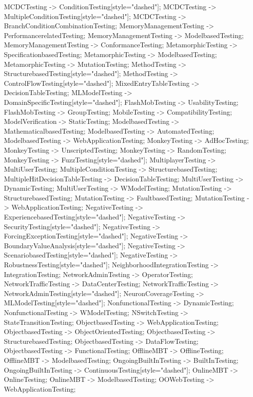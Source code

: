 \documentclass{article}
\begin{document}
{MCDCTesting -> ConditionTesting[style="dashed"];
MCDCTesting -> MultipleConditionTesting[style="dashed"];
MCDCTesting -> BranchConditionCombinationTesting;
MemoryManagementTesting -> PerformancerelatedTesting;
MemoryManagementTesting -> ModelbasedTesting;
MemoryManagementTesting -> ConformanceTesting;
MetamorphicTesting -> SpecificationbasedTesting;
MetamorphicTesting -> ModelbasedTesting;
MetamorphicTesting -> MutationTesting;
MethodTesting -> StructurebasedTesting[style="dashed"];
MethodTesting -> ControlFlowTesting[style="dashed"];
MixedEntryTableTesting -> DecisionTableTesting;
MLModelTesting -> DomainSpecificTesting[style="dashed"];
FlashMobTesting -> UsabilityTesting;
FlashMobTesting -> GroupTesting;
MobileTesting -> CompatibilityTesting;
ModelVerification -> StaticTesting;
ModelbasedTesting -> MathematicalbasedTesting;
ModelbasedTesting -> AutomatedTesting;
ModelbasedTesting -> WebApplicationTesting;
MonkeyTesting -> AdHocTesting;
MonkeyTesting -> UnscriptedTesting;
MonkeyTesting -> RandomTesting;
MonkeyTesting -> FuzzTesting[style="dashed"];
MultiplayerTesting -> MultiUserTesting;
MultipleConditionTesting -> StructurebasedTesting;
MultipleHitDecisionTableTesting -> DecisionTableTesting;
MultiUserTesting -> DynamicTesting;
MultiUserTesting -> WModelTesting;
MutationTesting -> StructurebasedTesting;
MutationTesting -> FaultbasedTesting;
MutationTesting -> WebApplicationTesting;
NegativeTesting -> ExperiencebasedTesting[style="dashed"];
NegativeTesting -> SecurityTesting[style="dashed"];
NegativeTesting -> ForcingExceptionTesting[style="dashed"];
NegativeTesting -> BoundaryValueAnalysis[style="dashed"];
NegativeTesting -> ScenariobasedTesting[style="dashed"];
NegativeTesting -> RobustnessTesting[style="dashed"];
NeighborhoodIntegrationTesting -> IntegrationTesting;
NetworkAdminTesting -> OperatorTesting;
NetworkTrafficTesting -> DataCenterTesting;
NetworkTrafficTesting -> NetworkAdminTesting[style="dashed"];
NeuronCoverageTesting -> MLModelTesting[style="dashed"];
NonfunctionalTesting -> DynamicTesting;
NonfunctionalTesting -> WModelTesting;
NSwitchTesting -> StateTransitionTesting;
ObjectbasedTesting -> WebApplicationTesting;
ObjectbasedTesting -> ObjectOrientedTesting;
ObjectbasedTesting -> StructurebasedTesting;
ObjectbasedTesting -> DataFlowTesting;
ObjectbasedTesting -> FunctionalTesting;
OfflineMBT -> OfflineTesting;
OfflineMBT -> ModelbasedTesting;
OngoingBuiltInTesting -> BuiltInTesting;
OngoingBuiltInTesting -> ContinuousTesting[style="dashed"];
OnlineMBT -> OnlineTesting;
OnlineMBT -> ModelbasedTesting;
OOWebTesting -> WebApplicationTesting;
}
\end{document}
